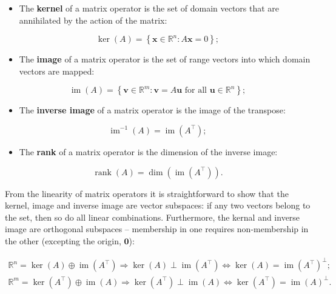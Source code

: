 \documentclass[12pt, twoside, draft]{article}
\begin{document}
\begin{itemize}
\item The \textbf{kernel} of a matrix operator is the set of domain vectors that are annihilated by the action of the matrix:
\end{itemize}
\begin{equation}\label{eq:matrix_kernel}
\ker(A) = \left\{ \mathbf{x} \in \mathbb{R}^n: A \mathbf{x} = 0 \right\}; 
\end{equation}
\begin{itemize}
\item The \textbf{image} of a matrix operator is the set of range vectors into which domain vectors are mapped:
\end{itemize}
\begin{equation}\label{eq:matrix_image}
\operatorname{im}(A) = \left\{ \mathbf{v} \in \mathbb{R}^m: \mathbf{v} = A \mathbf{u} \text{ for all } \mathbf{u} \in \mathbb{R}^n \right\};
\end{equation}
\begin{itemize}
\item The \textbf{inverse image} of a matrix operator is the image of the transpose:
\end{itemize}
\begin{equation}\label{eq:matrix_inverse_image}
\operatorname{im}^{-1}(A) = \operatorname{im}(A^\top);  
\end{equation}
\begin{itemize}
\item The \textbf{rank} of a matrix operator is the dimension of the inverse image:
\end{itemize}
\begin{equation}\label{eq:matrix_rank}
\operatorname{rank}(A) = \dim(\operatorname{im}(A^\top)) .   
\end{equation}

From the linearity of matrix operators it is straightforward to show that the kernel, image and inverse image are vector subspaces: if any two vectors belong to the set, then so do all linear combinations.  Furthermore, the kernal and inverse image are orthogonal subspaces -- membership in one requires non-membership in the other (excepting the origin, $\mathbf{0}$):

\begin{equation}\label{eq:matrix_transpose_subspaces}
\begin{array}{l}
\mathbb{R}^n = \ker(A) \oplus \operatorname{im}(A^\top) \Rightarrow \ker(A) \perp \operatorname{im}(A^\top) \Leftrightarrow \ker(A) = \operatorname{im}(A^\top)^\perp; \\
\mathbb{R}^m = \ker(A^\top) \oplus \operatorname{im}(A) \Rightarrow \ker(A^\top) \perp \operatorname{im}(A) \Leftrightarrow \ker(A^\top) = \operatorname{im}(A)^\perp.
\end{array}
\end{equation}
\end{document}
